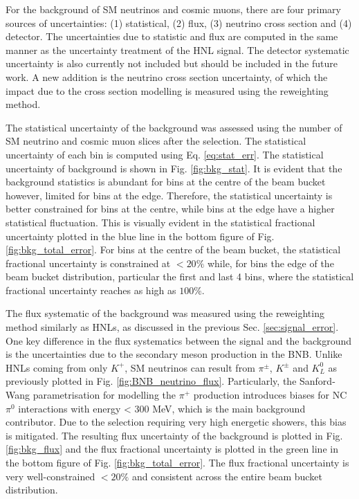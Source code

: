 For the background of SM neutrinos and cosmic muons, there are four primary sources of uncertainties: (1) statistical, (2) flux, (3) neutrino cross section and (4) detector.
The uncertainties due to statistic and flux are computed in the same manner as the uncertainty treatment of the HNL signal.
The detector systematic uncertainty is also currently not included but should be included in the future work.
A new addition is the neutrino cross section uncertainty, of which the impact due to the cross section modelling is measured using the reweighting method.

The statistical uncertainty of the background was assessed using the number of SM neutrino and cosmic muon slices after the selection.
The statistical uncertainty of each bin is computed using Eq. \ref{eq:stat_err}.
The statistical uncertainty of background is shown in Fig. \ref{fig:bkg_stat}.
It is evident that the background statistics is abundant for bins at the centre of the beam bucket however, limited for bins at the edge.
Therefore, the statistical uncertainty is better constrained for bins at the centre, while bins at the edge have a higher statistical fluctuation.
This is visually evident in the statistical fractional uncertainty plotted in the blue line in the bottom figure of Fig. \ref{fig:bkg_total_error}.
For bins at the centre of the beam bucket, the statistical fractional uncertainty is constrained at $< 20\%$ while, for bins the edge of the beam bucket distribution, particular the first and last 4 bins, where the statistical fractional uncertainty reaches as high as $100\%$.

The flux systematic of the background was measured using the reweighting method similarly as HNLs, as discussed in the previous Sec. \ref{sec:signal_error}.
One key difference in the flux systematics between the signal and the background is the uncertainties due to the secondary meson production in the BNB.
Unlike HNLs coming from only $K^+$, SM neutrinos can result from $\pi^\pm$, $K^\pm$ and $K^0_L$ as previously plotted in Fig. \ref{fig:BNB_neutrino_flux}.
Particularly, the Sanford-Wang parametrisation for modelling the $\pi^+$ production introduces biases for NC $\pi^0$ interactions with energy < 300 MeV, which is the main background contributor.
Due to the selection requiring very high energetic showers, this bias is mitigated.
The resulting flux uncertainty of the background is plotted in Fig. \ref{fig:bkg_flux} and the flux fractional uncertainty is plotted in the green line in the bottom figure of Fig. \ref{fig:bkg_total_error}.
The flux fractional uncertainty is very well-constrained $<20 \%$ and consistent across the entire beam bucket distribution.

